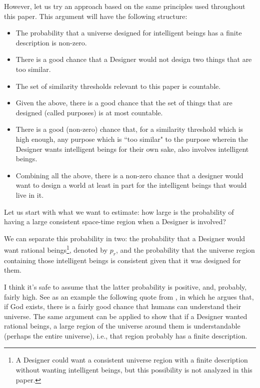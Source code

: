 \documentclass[a4paper
,draft
]{article}
\newcommand{\paper}[1]{paper}
\newcommand{\ghilimele}[1]{``#1"}
\begin{document}
However, let us try an approach based on the same principles used throughout
this \paper{}.
This argument will have the following structure:
\begin{itemize}
  \item The probability that a universe designed for intelligent beings
        has a finite description is non-zero.
  \item There is a good chance that a Designer would not design two things
        that are too similar.
  \item The set of similarity thresholds relevant to this paper is
        countable.
  \item Given the above, there is a good chance that the set of things that
        are designed (called purposes) is at most countable.
  \item There is a good (non-zero) chance that, for a similarity threshold
        which is high enough,
        any purpose which is \ghilimele{too similar} to the purpose wherein the Designer
        wants intelligent beings for their own sake, also involves intelligent
        beings.
  \item Combining all the above, there is a non-zero chance that a designer
        would want to design a world at least in part for the intelligent
        beings that would live in it.
\end{itemize}

Let us start with what we want to estimate:
how large is the probability of having
a large consistent space-time region when a Designer is involved?

We can separate this probability in two: the probability that a Designer
would want rational beings\footnote{A Designer could want a consistent universe
region with a finite
description without wanting intelligent beings, but this possibility is not
analyzed in this paper.}, denoted by $p_r$, and
the probability that the universe region containing
those intelligent beings is consistent
given that it was designed for them.

I think it's safe to assume that the latter probability is positive,
and, probably, fairly high. See as an example the following quote from
\textcite{Swinburne2003}, in which he argues that, if God exists,
there is a fairly good chance that humans can understand their universe.
The same argument can be applied to show that if a Designer wanted
rational beings, a large region of the universe around them is understandable
(perhaps the entire universe), i.e., that region probably has a finite
description.
\end{document}
